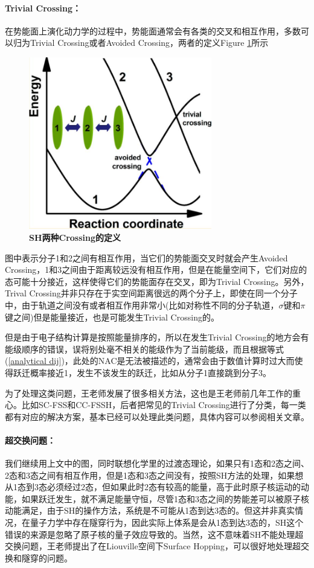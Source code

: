 \documentclass[12pt,a4paper,openany,twoside]{book}
\numberwithin{equation}{section}
\begin{document}
        \paragraph{Trivial Crossing：}在势能面上演化动力学的过程中，势能面通常会有各类的交叉和相互作用，多数可以归为Trivial Crossing或者Avoided Crossing，两者的定义Figure \ref{two kinds of crossing}所示
        \begin{figure}
          \centering
          \includegraphics[width = 8cm]{fig/crossing.jpg}
          \caption{\textbf{SH两种Crossing的定义}}
          \label{two kinds of crossing}
        \end{figure}
        图中表示分子1和2之间有相互作用，当它们的势能面交叉时就会产生Avoided Crossing，1和3之间由于距离较远没有相互作用，但是在能量空间下，它们对应的态可能十分接近，这样使得它们的势能面存在交叉，即为Trivial Crossing。另外，Trival Crossing并非只存在于实空间距离很远的两个分子上，即使在同一个分子中，由于轨道之间没有或者相互作用非常小(比如对称性不同的分子轨道，$\sigma$键和$\pi$键之间)但是能量接近，也是可能发生Trivial Crossing的。

        但是由于电子结构计算是按照能量排序的，所以在发生Trivial Crossing的地方会有能级顺序的错误，误将别处毫不相关的能级作为了当前能级，而且根据等式(\ref{analytical dij})，此处的NAC是无法被描述的，通常会由于数值计算时过大而使得跃迁概率接近1，发生不该发生的跃迁，比如从分子1直接跳到分子3。

        为了处理这类问题，王老师发展了很多相关方法，这也是王老师前几年工作的重心。比如SC-FSS和CC-FSSH，后者把常见的Trivial Crossing进行了分类，每一类都有对应的解决方案，基本已经可以处理此类问题，具体内容可以参阅相关文章\cite{wang2014simple}\cite{Qiu2018}\cite{Bai2018}。

        \paragraph{超交换问题：}我们继续用上文中的图，同时联想化学里的过渡态理论，如果只有1态和2态之间、2态和3态之间有相互作用，但是1态和3态之间没有，按照SH方法的处理，如果想从1态到3态必须经过2态，但如果此时2态有较高的能量，高于此时原子核运动的动能，如果跃迁发生，就不满足能量守恒，尽管1态和3态之间的势能差可以被原子核动能满足，由于SH的操作方法，系统是不可能从1态到达3态的。但这并非真实情况，在量子力学中存在隧穿行为，因此实际上体系是会从1态到达3态的，SH这个错误的来源是忽略了原子核的量子效应导致的。当然，这不意味着SH不能处理超交换问题，王老师提出了在Liouville空间下Surface Hopping\cite{wang2015fewest}，可以很好地处理超交换和隧穿的问题。
\end{document}
